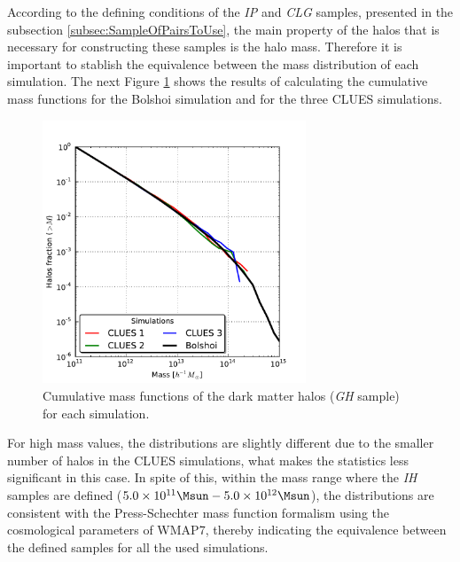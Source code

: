 According to the defining conditions of the \textit{IP} and \textit{CLG} 
samples, presented in the subsection \ref{subsec:SampleOfPairsToUse}, the
main property of the halos that is necessary for cons\-tructing these samples
is the halo mass. Therefore it is important to stablish the equivalence 
between the mass distribution of each simulation. The next Figure 
\ref{fig:IMF} shows the results of calculating the cumulative mass 
functions for the Bolshoi simulation and for the three CLUES simulations.


\begin{figure}[htbp]
	\centering
	\includegraphics[width=0.70\textwidth]
	{./figures/4_results/Halos_IMF.pdf}
	
	\caption{\small{Cumulative mass functions of the dark matter halos
	(\textit{GH} sample) for each simulation.}}
	\label{fig:IMF}
\end{figure}


For high mass values, the distributions are slightly different due to the 
smaller number of halos in the CLUES simulations, what makes the statistics
less significant in this case. In spite of this, within the mass range 
where the \textit{IH} samples are defined ($5.0 \times 10^{11}\Msun - 
5.0\times 10 ^{12}\Msun$), the distributions are consistent with the 
Press-Schechter mass function formalism \cite{press1974} using the 
cosmological parameters of WMAP7, thereby indicating the equivalence 
between the defined samples for all the used simulations.




